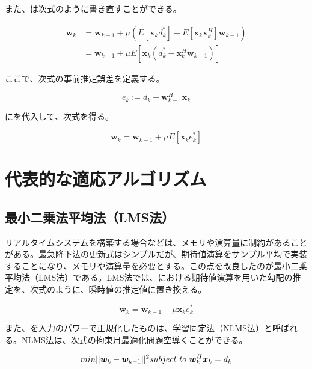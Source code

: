 また、は次式のように書き直すことができる。

\begin{equation}
\begin{split}
\bm{w}_k &= \bm{w}_{k-1} + \mu (E[\bm{x}_k d_k^*] - E[\bm{x}_k \bm{x}_k^H] \bm{w}_{k-1}) \\
         &= \bm{w}_{k-1} + \mu E[\bm{x}_k (d_k^* - \bm{x}_k^H \bm{w}_{k-1})]
\end{split}
\label{equ:w_complex}
\end{equation}

ここで、次式の事前推定誤差を定義する。

\begin{equation}
e_k := d_k - \bm{w}_{k-1}^H \bm{x}_k
\label{equ:prior_estimation_error}
\end{equation}

にを代入して、次式を得る。

\begin{equation}
\bm{w}_k = \bm{w}_{k-1} + \mu E[\bm{x}_k e_k^*]
\label{equ:w_update_sd}
\end{equation}


\section{代表的な適応アルゴリズム}\label{main-algo}

\subsection{最小二乗法平均法（LMS法）}\label{lms}

リアルタイムシステムを構築する場合などは、メモリや演算量に制約があることがある。最急降下法の更新式はシンプルだが、期待値演算をサンプル平均で実装することになり、メモリや演算量を必要とする。この点を改良したのが最小二乗平均法（LMS法）である。LMS法では、における期待値演算を用いた勾配の推定を、次式のように、瞬時値の推定値に置き換える。

\begin{equation}
\bm{w}_k = \bm{w}_{k-1} + \mu \bm{x}_k e_k^*
\label{equ:w_update_lms_simple}
\end{equation}

また、を入力のパワーで正規化したものは、学習同定法（NLMS法）と呼ばれる。NLMS法は、次式の拘束月最適化問題空導くことができる。

\begin{equation}
min ||\bm{w}_k - \bm{w}_{k-1}||^2 \\
subject \ to \ \bm{w}_k^H \bm{x}_k = d_k
\end{equation}

